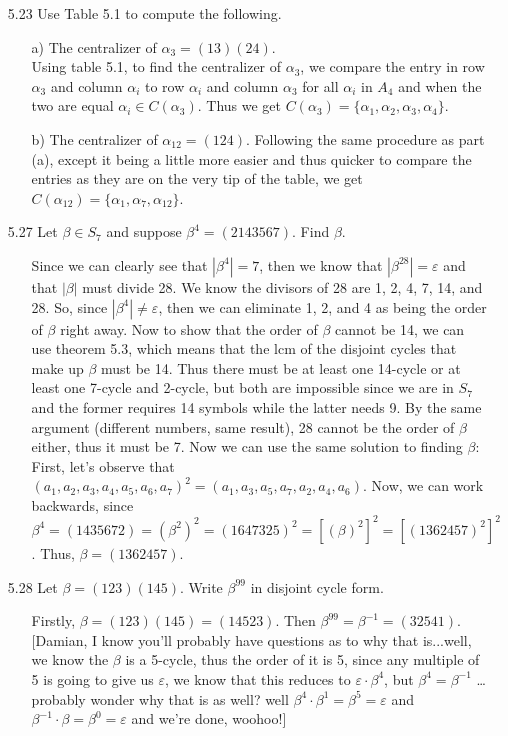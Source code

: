 \documentclass[12pt]{article}
\begin{document}
\begin{enumerate}
\item[5.23] Use Table 5.1 to compute the following.
\begin{enumerate}
\item[a)] The centralizer of $\alpha_3 = (13)(24)$. \\
Using table 5.1, to find the centralizer of $\alpha_3$, we compare the entry 
in row $\alpha_3$ and column $\alpha_i$ to row $\alpha_i$ and column $\alpha_3$ for all $\alpha_i$ 
in $A_4$ and when the two are equal $\alpha_i \in C(\alpha_3)$. Thus we get 
$C(\alpha_3) = \{ \alpha_1, \alpha_2, \alpha_3, \alpha_4 \}$.
\item[b)] The centralizer of $\alpha_{12} = (124)$.
Following the same procedure as part (a), except it being a little more easier and 
thus quicker to compare the entries as they are on the very tip of the table, we get
$C(\alpha_{12}) = \{ \alpha_1, \alpha_7, \alpha_{12} \}$.
\end{enumerate}

\item[5.27] Let $\beta \in S_7$ and suppose $\beta^4 = (2143567)$. Find $\beta$.
\begin{enumerate}
\item[] Since we can clearly see that $|\beta^4| = 7$, then we know that
$|\beta^{28}| = \varepsilon$ and that $|\beta|$ must divide 28. We know
the divisors of 28 are 1, 2, 4, 7, 14, and 28. So, since
$|\beta^4| \neq \varepsilon$, then we can eliminate 1, 2, and 4 as being the
order of $\beta$ right away. Now to show that the order of $\beta$ cannot be 14,
we can use theorem 5.3, which means that the lcm of the disjoint cycles that
make up $\beta$ must be 14. Thus there must be at least one 14-cycle or at least
one 7-cycle and 2-cycle, but both are impossible since we are in $S_7$ and the
former requires 14 symbols while the latter needs 9. By the same argument (different
numbers, same result), 28 cannot be the order of $\beta$ either, thus it must be 7. 
Now we can use the same solution to finding $\beta$: \\
First, let's observe that \\
$(a_1, a_2, a_3, a_4, a_5, a_6, a_7)^2 = (a_1, a_3, a_5, a_7, a_2, a_4, a_6)$.
Now, we can work backwards, since $\beta^4 = (1435672) = (\beta^2)^2 = 
(1647325)^2 = [(\beta)^2]^2 = [(1362457)^2]^2$. Thus, $\beta =
(1362457)$.
\end{enumerate}


\item[5.28] Let $\beta = (123)(145)$. Write $\beta^{99}$ in disjoint cycle form.
\begin{enumerate}
\item[] Firstly, $\beta = (123)(145) = (14523)$. Then $\beta^{99} = \beta^{-1} = (32541)$.
[Damian, I know you'll probably have questions as to why that is...well, we know the $\beta$
is a 5-cycle, thus the order of it is 5, since any multiple of 5 is going to give us 
$\varepsilon$, we know that this reduces to $\varepsilon \cdot \beta^4$, but $\beta^4 =
\beta^{-1}$ \ldots probably wonder why that is as well? well $\beta^4 \cdot \beta^1 = 
\beta^5 = \varepsilon$ and $\beta^{-1} \cdot \beta = \beta^0 = \varepsilon$ and we're done, 
woohoo!]
\end{enumerate}


\end{enumerate}
\end{document}
